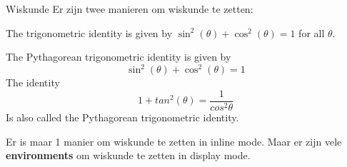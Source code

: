 \copyrightTim

\begin{frame}[fragile]{Wiskunde}
Er zijn twee manieren om wiskunde te zetten:

\begin{tcolorbox}[width=13cm, title={inline mode}, size=small]
    The trigonometric identity is given by $ \sin^2(\theta) + \cos^2(\theta) = 1 $ for all $ \theta $.
\end{tcolorbox}

 \begin{tcolorbox}[width=13cm, title={display mode}, size=small]
    The Pythagorean trigonometric identity is given by
    \begin{equation} \sin^2(\theta) + \cos^2(\theta) = 1 \end{equation}
    The identity
    \begin{equation} 1 + tan^2(\theta) = \frac{1}{cos^2\theta}\end{equation}
    Is also called the Pythagorean trigonometric identity.

\end{tcolorbox}

{\small Er is maar 1 manier om wiskunde te zetten in inline mode.
Maar er zijn vele \textbf{environments} om wiskunde te zetten in display mode.}
\end{frame}